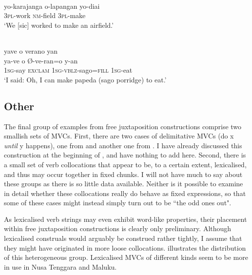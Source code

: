 \ea \label{Tobelo_16}
\\
\gll yo-karajanga o-lapangan yo-diai \\
3\textsc{pl}-work \textsc{nm}-field 3\textsc{pl}-make \\
\glft `We [sic] worked to make an airfield.' \\ 
\z

\ea \label{Dusner_4}
\\
\glll yave o verano yan \\
ya-ve o Ø-ve-ran=o y-an \\
1\textsc{sg}-say \textsc{exclam} 1\textsc{sg}-\textsc{vblz}-sago=\textsc{fill} 1\textsc{sg}-eat \\
\glft `I said: Oh, I can make papeda (sago porridge) to eat.'\\ 
\z

\subsection{Other}

The final group of examples from free juxtaposition constructions comprise two smallish sets of MVCs. First, there are two cases of delimitative MVCs (do x \textit{until} y happens), one from  and another one from . I have already discussed this construction at the beginning of , and have nothing to add here. Second, there is a small set of verb collocations that appear to be, to a certain extent, lexicalised, and thus may occur together in fixed chunks. I will not have much to say about these groups as there is so little data available. Neither is it possible to examine in detail whether these collocations really do behave as fixed expressions, so that some of these cases might instead simply turn out to be ``the odd ones out".

As lexicalised verb strings may even exhibit word-like properties, their placement within free juxtaposition constructions is clearly only preliminary. Although lexicalised construals would arguably be construed rather tightly, I assume that they might have originated in more loose collocations.  illustrates the distribution of this heterogeneous group. Lexicalised MVCs of different kinds seem to be more in use in Nusa Tenggara and Maluku. 

